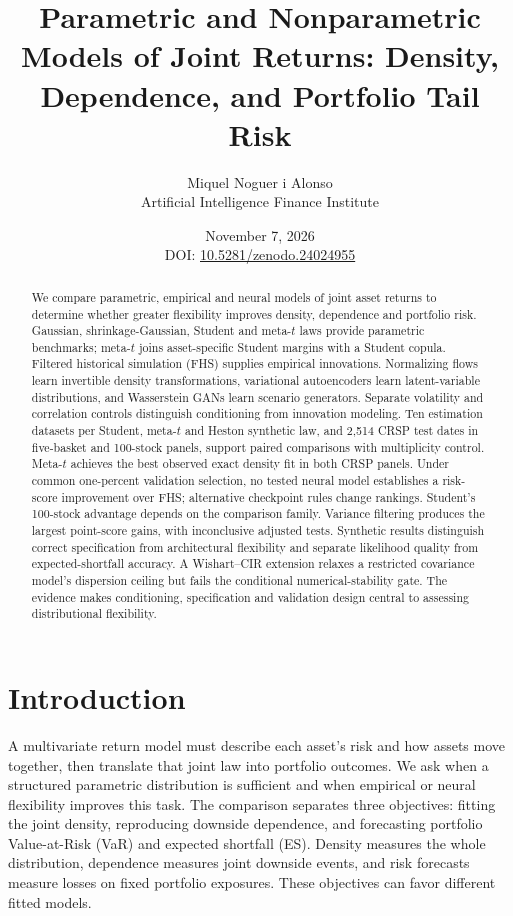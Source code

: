 \documentclass[11pt]{article}
\title{Parametric and Nonparametric Models of Joint Returns: Density, Dependence, and Portfolio Tail Risk}
\author{Miquel Noguer i Alonso\\Artificial Intelligence Finance Institute}
\date{November 7, 2026\\[0.4em]\small DOI: \href{https://doi.org/10.5281/zenodo.24024955}{10.5281/zenodo.24024955}}
\theoremstyle{definition}\newtheorem{definition}[theorem]{Definition}
\theoremstyle{remark}\newtheorem{remark}[theorem]{Remark}
\begin{document}
\maketitle
\begin{abstract}
We compare parametric, empirical and neural models of joint asset returns to determine whether greater flexibility improves density, dependence and portfolio risk. Gaussian, shrinkage-Gaussian, Student and meta-$t$ laws provide parametric benchmarks; meta-$t$ joins asset-specific Student margins with a Student copula. Filtered historical simulation (FHS) supplies empirical innovations. Normalizing flows learn invertible density transformations, variational autoencoders learn latent-variable distributions, and Wasserstein GANs learn scenario generators. Separate volatility and correlation controls distinguish conditioning from innovation modeling. Ten estimation datasets per Student, meta-$t$ and Heston synthetic law, and 2,514 CRSP test dates in five-basket and 100-stock panels, support paired comparisons with multiplicity control. Meta-$t$ achieves the best observed exact density fit in both CRSP panels. Under common one-percent validation selection, no tested neural model establishes a risk-score improvement over FHS; alternative checkpoint rules change rankings. Student's 100-stock advantage depends on the comparison family. Variance filtering produces the largest point-score gains, with inconclusive adjusted tests. Synthetic results distinguish correct specification from architectural flexibility and separate likelihood quality from expected-shortfall accuracy. A Wishart--CIR extension relaxes a restricted covariance model's dispersion ceiling but fails the conditional numerical-stability gate. The evidence makes conditioning, specification and validation design central to assessing distributional flexibility.

\end{abstract}

\section{Introduction}
A multivariate return model must describe each asset's risk and how assets move together, then translate that joint law into portfolio outcomes. We ask when a structured parametric distribution is sufficient and when empirical or neural flexibility improves this task. The comparison separates three objectives: fitting the joint density, reproducing downside dependence, and forecasting portfolio Value-at-Risk (VaR) and expected shortfall (ES). Density measures the whole distribution, dependence measures joint downside events, and risk forecasts measure losses on fixed portfolio exposures. These objectives can favor different fitted models.
\end{document}
